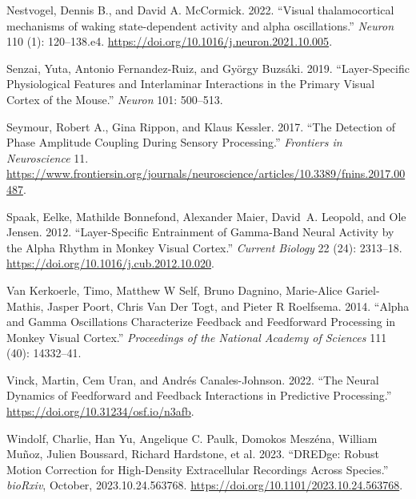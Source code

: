 \documentclass[
  letterpaper,
  DIV=11,
  numbers=noendperiod]{scrartcl}
\newlength{\cslhangindent}
\newenvironment{CSLReferences}[2] %
 {\begin{list}{}{%
  \setlength{\itemindent}{0pt}
  \setlength{\leftmargin}{0pt}
  \setlength{\parsep}{0pt}
  \ifodd #1
   \setlength{\leftmargin}{\cslhangindent}
   \setlength{\itemindent}{-1\cslhangindent}
  \fi
  \setlength{\itemsep}{#2\baselineskip}}}
 {\end{list}}
\begin{document}
\begin{CSLReferences}{1}{0}
Nestvogel, Dennis B., and David A. McCormick. 2022. {``Visual
thalamocortical mechanisms of waking state-dependent activity and alpha
oscillations.''} \emph{Neuron} 110 (1): 120--138.e4.
\url{https://doi.org/10.1016/j.neuron.2021.10.005}.

Senzai, Yuta, Antonio Fernandez-Ruiz, and György Buzsáki. 2019.
{``Layer-Specific Physiological Features and Interlaminar Interactions
in the Primary Visual Cortex of the Mouse.''} \emph{Neuron} 101:
500--513.

Seymour, Robert A., Gina Rippon, and Klaus Kessler. 2017. {``The
Detection of Phase Amplitude Coupling During Sensory Processing.''}
\emph{Frontiers in Neuroscience} 11.
\url{https://www.frontiersin.org/journals/neuroscience/articles/10.3389/fnins.2017.00487}.

Spaak, Eelke, Mathilde Bonnefond, Alexander Maier, David~A. Leopold, and
Ole Jensen. 2012. {``Layer-Specific Entrainment of Gamma-Band Neural
Activity by the Alpha Rhythm in Monkey Visual Cortex.''} \emph{Current
Biology} 22 (24): 2313--18.
\url{https://doi.org/10.1016/j.cub.2012.10.020}.

Van Kerkoerle, Timo, Matthew W Self, Bruno Dagnino, Marie-Alice
Gariel-Mathis, Jasper Poort, Chris Van Der Togt, and Pieter R Roelfsema.
2014. {``Alpha and Gamma Oscillations Characterize Feedback and
Feedforward Processing in Monkey Visual Cortex.''} \emph{Proceedings of
the National Academy of Sciences} 111 (40): 14332--41.

Vinck, Martin, Cem Uran, and Andrés Canales-Johnson. 2022. {``The Neural
Dynamics of Feedforward and Feedback Interactions in Predictive
Processing.''} \url{https://doi.org/10.31234/osf.io/n3afb}.

Windolf, Charlie, Han Yu, Angelique C. Paulk, Domokos Meszéna, William
Muñoz, Julien Boussard, Richard Hardstone, et al. 2023. {``DREDge:
Robust Motion Correction for High-Density Extracellular Recordings
Across Species.''} \emph{bioRxiv}, October, 2023.10.24.563768.
\url{https://doi.org/10.1101/2023.10.24.563768}.

\end{CSLReferences}
\end{document}
